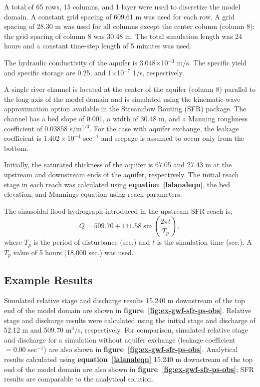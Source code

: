A total of 65 rows, 15 columns, and 1 layer were used to discretize the model domain. A constant grid spacing of 609.61 m was used for each row. A grid spacing of 28.30 m was used for all columns except the center column (column 8); the grid spacing of column 8 was 30.48 m. The total simulation length was 24 hours and a constant time-step length of 5 minutes was used.

The hydraulic conductivity of the aquifer is 3.048$\times$10$^{-3}$ m/s. The specific yield and specific storage are 0.25, and 1$\times$10$^{-7}$ 1/s, respectively.
 


A single river channel is located at the center of the aquifer (column 8) parallel to the long axis of the model domain and is simulated using the kinematic-wave approximation option available in the Streamflow Routing (SFR) package. The channel has a bed slope of 0.001, a width of 30.48 m, and a Manning roughness coefficient of 0.03858 s/m$^{1/3}$. For the case with aquifer exchange, the leakage coefficient is $1.402 \times 10^{-4}$ sec$^{-1}$ and seepage is assumed to occur only from the bottom.

Initially, the saturated thickness of the aquifer is 67.05 and 27.43 m at the upstream and downstream ends of the aquifer, respectively. The initial reach stage in each reach was calculated using \textbf{equation~\ref{lalanaleqn}}, the bed elevation, and Mannings equation using reach parameters.




The sinusoidal flood hydrograph introduced in the upstream SFR reach is,
\nolinebreak
\begin{equation} \label{lalhydrographeqn}
Q = 509.70 + 141.58 \sin \left( \frac{2 \pi t}{T_p} \right),
\end{equation}
\noindent
where $T_p$ is the period of disturbance (sec.) and $t$ is the simulation time (sec.). A $T_p$ value of 5 hours (18,000 sec.) was used.

\subsection{Example Results}

Simulated relative stage and discharge results 15,240 m downstream of the top end of the model domain are shown in \textbf{figure~\ref{fig:ex-gwf-sfr-ps-obs}}. Relative stage and discharge results were calculated using the initial stage and discharge of 52.12 m and 509.70 m$^3$/s, respectively. For comparison, simulated relative stage and discharge for a simulation without aquifer exchange (leakage coefficient $= 0.00$ sec$^{-1}$) are also shown in  \textbf{figure~\ref{fig:ex-gwf-sfr-ps-obs}}. Analytical results calculated using \textbf{equation~\ref{lalanaleqn}} 15,240 m downstream of the top end of the model domain are also shown in \textbf{figure~\ref{fig:ex-gwf-sfr-ps-obs}}; SFR results are comparable to the analytical solution.


